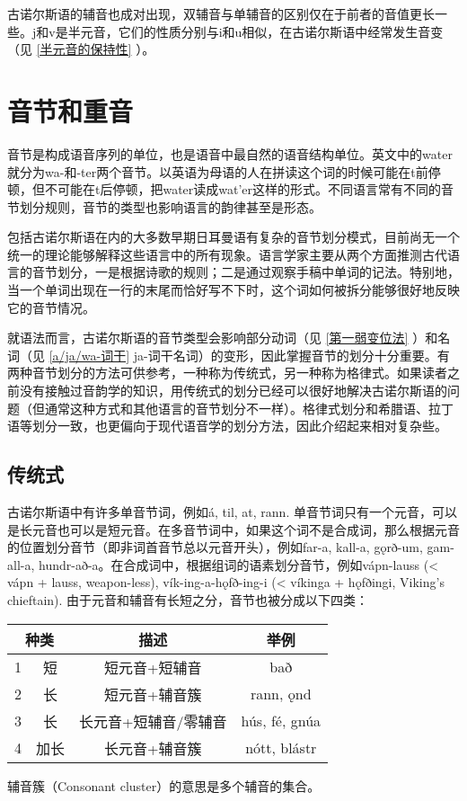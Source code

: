古诺尔斯语的辅音也成对出现，双辅音与单辅音的区别仅在于前者的音值更长一些。j和v是半元音，它们的性质分别与i和u相似，在古诺尔斯语中经常发生音变（见 \ref{半元音的保持性} ）。

\section{音节和重音}
\label{sec:accent}

音节是构成语音序列的单位，也是语音中最自然的语音结构单位。英文中的water就分为wa-和-ter两个音节。以英语为母语的人在拼读这个词的时候可能在t前停顿，但不可能在t后停顿，把water读成wat'er这样的形式。不同语言常有不同的音节划分规则，音节的类型也影响语言的韵律甚至是形态。

包括古诺尔斯语在内的大多数早期日耳曼语有复杂的音节划分模式，目前尚无一个统一的理论能够解释这些语言中的所有现象。语言学家主要从两个方面推测古代语言的音节划分，一是根据诗歌的规则；二是通过观察手稿中单词的记法。特别地，当一个单词出现在一行的末尾而恰好写不下时，这个词如何被拆分能够很好地反映它的音节情况。

就语法而言，古诺尔斯语的音节类型会影响部分动词（见 \ref{第一弱变位法} ）和名词（见 \ref{a/ja/wa-词干} ja-词干名词）的变形，因此掌握音节的划分十分重要。有两种音节划分的方法可供参考，一种称为传统式，另一种称为格律式。如果读者之前没有接触过音韵学的知识，用传统式的划分已经可以很好地解决古诺尔斯语的问题（但通常这种方式和其他语言的音节划分不一样）。格律式划分和希腊语、拉丁语等划分一致，也更偏向于现代语音学的划分方法，因此介绍起来相对复杂些。

\subsection*{传统式}

古诺尔斯语中有许多单音节词，例如á, til, at, rann. 单音节词只有一个元音，可以是长元音也可以是短元音。在多音节词中，如果这个词不是合成词，那么根据元音的位置划分音节（即非词首音节总以元音开头），例如far-a, kall-a, gǫrð-um, gam-all-a, hundr-að-a。在合成词中，根据组词的语素划分音节，例如vápn-lauss (< vápn + lauss, weapon-less), vík-ing-a-hǫfð-ing-i (< víkinga + hǫfðingi, Viking's chieftain). 由于元音和辅音有长短之分，音节也被分成以下四类：

\begin{table}[H]
    \centering
    \begin{tabular}{@{}cccc@{}}
        \toprule
        \multicolumn{2}{c}{\textbf{种类}} & \textbf{描述} & \textbf{举例}                                  \\ \midrule
        1                        & 短   & 短元音+短辅音        & bað            \\
        2                        & 长   & 短元音+辅音簇        & rann, ǫnd      \\
        3                        & 长   & 长元音+短辅音/零辅音 & hús, fé, gnúa  \\
        4                        & 加长 & 长元音+辅音簇        & nótt,   blástr \\ \bottomrule
    \end{tabular}
\end{table}
辅音簇（Consonant cluster）的意思是多个辅音的集合。

